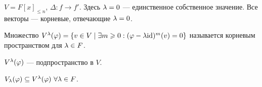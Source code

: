 \begin{Examples}
$V = F[x]_{\leqslant n}$, $\Delta: f \rightarrow f'$. Здесь $\lambda = 0$ --- единственное собственное значение. Все векторы --- корневые, отвечающие $\lambda = 0$. 
\end{Examples}

\begin{Def}
Множество $V^\lambda(\varphi) = \{ v \in V \mid \exists m \geqslant 0  : (\varphi - \lambda\mathrm{id})^m(v) = 0 \}$ называется корневым пространством для $\lambda \in F$.
\end{Def}

\begin{Task}
$V^\lambda(\varphi)$ --- подпространство в $V$.
\end{Task}

\begin{Comment}
$V_\lambda(\varphi) \subseteq V^\lambda(\varphi) \ \forall \lambda \in F$.
\end{Comment}

